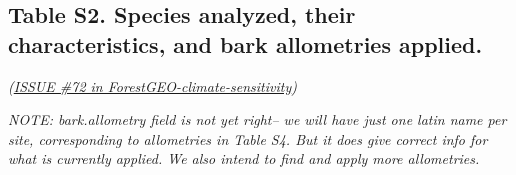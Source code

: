 \documentclass[
]{article}
\begin{document}
\newpage

\hypertarget{table-s2.-species-analyzed-their-characteristics-and-bark-allometries-applied.}{%
\subsection{Table S2. Species analyzed, their characteristics, and bark
allometries
applied.}\label{table-s2.-species-analyzed-their-characteristics-and-bark-allometries-applied.}}

\emph{(\href{https://github.com/EcoClimLab/ForestGEO-climate-sensitivity/issues/72}{ISSUE
\#72 in ForestGEO-climate-sensitivity})}

\emph{NOTE: bark.allometry field is not yet right-- we will have just
one latin name per site, corresponding to allometries in Table S4. But
it does give correct info for what is currently applied. We also intend
to find and apply more allometries.}
\end{document}
